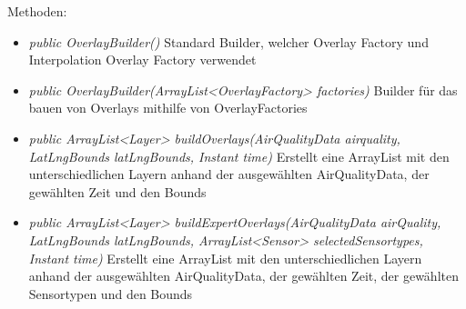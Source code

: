 Methoden:
\begin{itemize}
    \item \emph{public OverlayBuilder()} Standard Builder, welcher Overlay Factory und Interpolation Overlay Factory verwendet
    \item \emph{public OverlayBuilder(ArrayList<OverlayFactory> factories)} Builder für das bauen von Overlays mithilfe von OverlayFactories
    \item \emph{public ArrayList<Layer> buildOverlays(AirQualityData airquality, LatLngBounds latLngBounds, Instant time)} Erstellt eine ArrayList mit den unterschiedlichen Layern anhand der ausgewählten AirQualityData, der gewählten Zeit und den Bounds
    \item \emph{public ArrayList<Layer> buildExpertOverlays(AirQualityData airQuality, LatLngBounds latLngBounds, ArrayList<Sensor> selectedSensortypes, Instant time)}  Erstellt eine ArrayList mit den unterschiedlichen Layern anhand der ausgewählten AirQualityData, der gewählten Zeit, der gewählten Sensortypen und den Bounds
\end{itemize}
